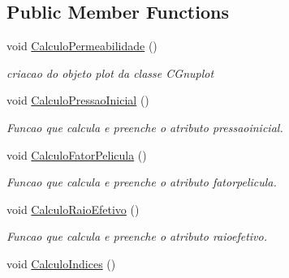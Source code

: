 \subsection*{Public Member Functions}
\begin{DoxyCompactItemize}
\item 
void \hyperlink{classCSimuladorAnaliseTestePressao_aefe1ad8908c9f3b7e48d9549675d8e14}{Calculo\-Permeabilidade} ()
\begin{DoxyCompactList}\small\item\em criacao do objeto plot da classe C\-Gnuplot \end{DoxyCompactList}\item 
\hypertarget{classCSimuladorAnaliseTestePressao_a2e8d3841dd1f0215ad21787138c7eb78}{void \hyperlink{classCSimuladorAnaliseTestePressao_a2e8d3841dd1f0215ad21787138c7eb78}{Calculo\-Pressao\-Inicial} ()}\label{classCSimuladorAnaliseTestePressao_a2e8d3841dd1f0215ad21787138c7eb78}

\begin{DoxyCompactList}\small\item\em Funcao que calcula e preenche o atributo pressaoinicial. \end{DoxyCompactList}\item 
\hypertarget{classCSimuladorAnaliseTestePressao_a61dc2ce4a3106aac530b64f5ab5cf30d}{void \hyperlink{classCSimuladorAnaliseTestePressao_a61dc2ce4a3106aac530b64f5ab5cf30d}{Calculo\-Fator\-Pelicula} ()}\label{classCSimuladorAnaliseTestePressao_a61dc2ce4a3106aac530b64f5ab5cf30d}

\begin{DoxyCompactList}\small\item\em Funcao que calcula e preenche o atributo fatorpelicula. \end{DoxyCompactList}\item 
\hypertarget{classCSimuladorAnaliseTestePressao_aa2f3fa25f3db3ca4c65d8b854e004781}{void \hyperlink{classCSimuladorAnaliseTestePressao_aa2f3fa25f3db3ca4c65d8b854e004781}{Calculo\-Raio\-Efetivo} ()}\label{classCSimuladorAnaliseTestePressao_aa2f3fa25f3db3ca4c65d8b854e004781}

\begin{DoxyCompactList}\small\item\em Funcao que calcula e preenche o atributo raioefetivo. \end{DoxyCompactList}\item 
\hypertarget{classCSimuladorAnaliseTestePressao_a5683325b63f4f55886a39a1495539219}{void \hyperlink{classCSimuladorAnaliseTestePressao_a5683325b63f4f55886a39a1495539219}{Calculo\-Indices} ()}\label{classCSimuladorAnaliseTestePressao_a5683325b63f4f55886a39a1495539219}


\end{DoxyCompactItemize}
